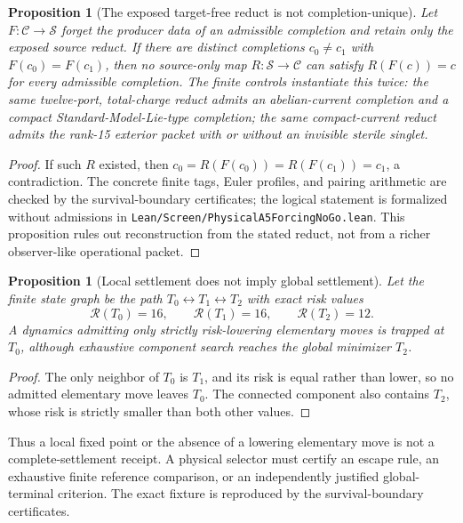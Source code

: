 \documentclass[11pt]{article}
\newtheorem{proposition}[theorem]{Proposition}
\begin{document}
\begin{proposition}[The exposed target-free reduct is not completion-unique]
\label{prop:a5-completion-nonuniqueness}
Let \(F:\mathcal C\to\mathcal S\) forget the producer data of an admissible
completion and retain only the exposed source reduct. If there are distinct
completions \(c_0\ne c_1\) with \(F(c_0)=F(c_1)\), then no source-only map
\(R:\mathcal S\to\mathcal C\) can satisfy \(R(F(c))=c\) for every admissible
completion. The finite controls instantiate this twice: the same twelve-port,
total-charge reduct admits an abelian-current completion and a compact
Standard-Model-Lie-type completion; the same compact-current reduct admits the
rank-15 exterior packet with or without an invisible sterile singlet.
\end{proposition}

\begin{proof}
If such \(R\) existed, then
\(c_0=R(F(c_0))=R(F(c_1))=c_1\), a contradiction. The concrete finite tags,
Euler profiles, and pairing arithmetic are checked by the
survival-boundary certificates; the logical
statement is formalized without admissions in
\texttt{Lean/\allowbreak Screen/\allowbreak PhysicalA5ForcingNoGo.lean}.
This proposition rules out reconstruction from the stated reduct, not from a
richer observer-like operational packet.
\end{proof}

\begin{proposition}[Local settlement does not imply global settlement]
\label{prop:a5-settlement-trap}
Let the finite state graph be the path
\(T_0\leftrightarrow T_1\leftrightarrow T_2\) with exact risk values
\[
\mathcal R(T_0)=16,\qquad \mathcal R(T_1)=16,\qquad
\mathcal R(T_2)=12.
\]
A dynamics admitting only strictly risk-lowering elementary moves is trapped
at \(T_0\), although exhaustive component search reaches the global minimizer
\(T_2\).
\end{proposition}

\begin{proof}
The only neighbor of \(T_0\) is \(T_1\), and its risk is equal rather than
lower, so no admitted elementary move leaves \(T_0\). The connected component
also contains \(T_2\), whose risk is strictly smaller than both other values.
\end{proof}

Thus a local fixed point or the absence of a lowering elementary move is not a
complete-settlement receipt. A physical selector must certify an escape rule,
an exhaustive finite reference comparison, or an independently justified
global-terminal criterion. The exact fixture is reproduced by the
survival-boundary certificates.
\end{document}
